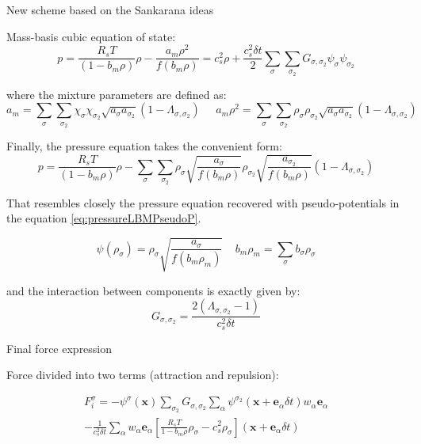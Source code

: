 \documentclass[8pt]{beamer}
\newcommand{\locx}{\mathbf{x}}
\newcommand{\vele}{\mathbf{e}_\alpha}
\begin{document}
	\begin{frame}{New scheme based on the Sankarana ideas}

		Mass-basis cubic equation of state:
		\begin{equation*}
			p = \frac{R_sT}{(1-b_m \rho)} \rho - \frac{a_m \rho^2}{f(b_m \rho)} = c_s^2 \rho + \frac{c_s^2 \delta t}{2} \sum_\sigma \sum_{\sigma_2} G_{\sigma,\sigma_2} \psi_\sigma \psi_{\sigma_2} 
		\end{equation*}

		where the mixture parameters are defined as:
		\begin{equation*}
			a_m = \sum_\sigma \sum_{\sigma_2} \chi_\sigma \chi_{\sigma_2} \sqrt{a_\sigma a_{\sigma_2}} (1-\varLambda_{\sigma, \sigma_2}) \; \; \; \; \; a_m \rho^2 = \sum_\sigma \sum_{\sigma_2} \rho_\sigma  \rho_{\sigma_2} \sqrt{a_\sigma a_{\sigma_2}} (1-\varLambda_{\sigma, \sigma_2})
		\end{equation*}

		Finally, the pressure equation takes the convenient form:
		\begin{equation}
			p = \frac{R_sT}{(1-b_m \rho)} \rho - \sum_\sigma \sum_{\sigma_2} \rho_\sigma  \sqrt{\frac{a_\sigma}{f(b_m \rho)} } \rho_{\sigma_2} \sqrt{\frac{a_{\sigma_2}}{f(b_m \rho)} }   (1-\varLambda_{\sigma, \sigma_2})
		\end{equation}

		That resembles closely the pressure equation recovered with pseudo-potentials in the equation \ref{eq:pressureLBMPseudoP}.

		\begin{equation*}\label{eq:newPseudopotential}
			\psi(\rho_\sigma) = \rho_\sigma \sqrt{\frac{a_\sigma}{f(b_m \rho_m)}} \; \; \; \; b_m \rho_m = \sum_\sigma b_\sigma \rho_\sigma
		\end{equation*}
		
		and the interaction between components is exactly given by:
		\begin{equation*}
			G_{\sigma,\sigma_2} = \frac{2(\varLambda_{\sigma, \sigma_2}-1)}{c_s^2 \delta t} 
		\end{equation*}
	
	\end{frame}

	\begin{frame}{Final force expression}

		Force divided into two terms (attraction and repulsion): 
		
		\begin{equation}\begin{split}
			F_i^\sigma = - \psi^\sigma(\locx) \sum_{\sigma_2} G_{\sigma,\sigma_2} \sum_\alpha \psi^{\sigma_2} ( \locx + \vele \delta t)  w_\alpha \vele\\
			 - \frac{1}{c_s^2 \delta t} \sum_\alpha  w_\alpha \vele [\frac{R_sT}{1-b_m \rho} \rho_\sigma - c_s^2 \rho_\sigma ] ( \locx + \vele \delta t) 
		\end{split}
		\end{equation}
	\end{frame}
	
\end{document}
